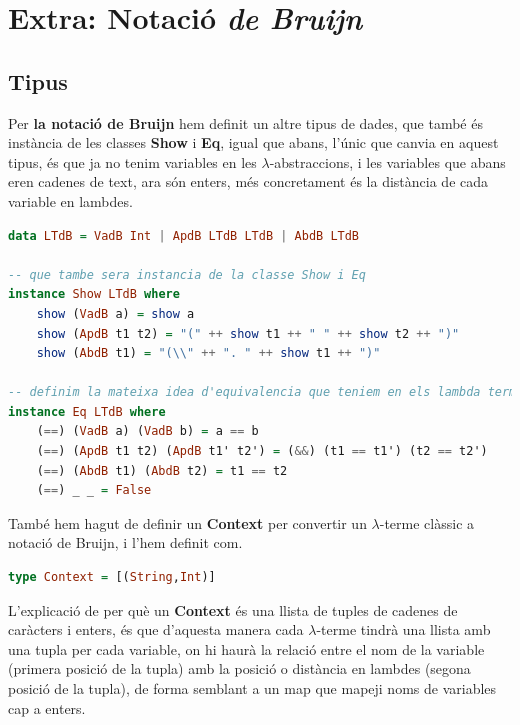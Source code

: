\documentclass[10pt,a4paper]{article}
\begin{document}
\clearpage

\section{Extra: Notació \textit{de Bruijn}}

\subsection{Tipus}

Per \textbf{la notació de Bruijn} hem definit un altre tipus de dades, que també és instància de les classes \textbf{Show} i \textbf{Eq}, igual que abans, l'únic que canvia en aquest tipus, és que ja no tenim variables en les $\lambda$-abstraccions, i les variables que abans eren cadenes de text, ara són enters, més concretament és la distància de cada variable en lambdes.

\begin{lstlisting}[language=Haskell]
data LTdB = VadB Int | ApdB LTdB LTdB | AbdB LTdB

-- que tambe sera instancia de la classe Show i Eq
instance Show LTdB where
    show (VadB a) = show a
    show (ApdB t1 t2) = "(" ++ show t1 ++ " " ++ show t2 ++ ")"
    show (AbdB t1) = "(\\" ++ ". " ++ show t1 ++ ")"

-- definim la mateixa idea d'equivalencia que teniem en els lambda termes pels lambda termes amb notacio de Bruijn
instance Eq LTdB where
    (==) (VadB a) (VadB b) = a == b
    (==) (ApdB t1 t2) (ApdB t1' t2') = (&&) (t1 == t1') (t2 == t2')
    (==) (AbdB t1) (AbdB t2) = t1 == t2
    (==) _ _ = False
\end{lstlisting}

També hem hagut de definir un \textbf{Context} per convertir un $\lambda$-terme clàssic a notació de Bruijn, i l'hem definit com.

\begin{lstlisting}[language=Haskell]
type Context = [(String,Int)]
\end{lstlisting}

L'explicació de per què un \textbf{Context} és una llista de tuples de cadenes de caràcters i enters, és que d'aquesta manera cada $\lambda$-terme tindrà una llista amb una tupla per cada variable, on hi haurà la relació entre el nom de la variable (primera posició de la tupla) amb la posició o distància en lambdes (segona posició de la tupla), de forma semblant a un map que mapeji noms de variables cap a enters.
\end{document}
